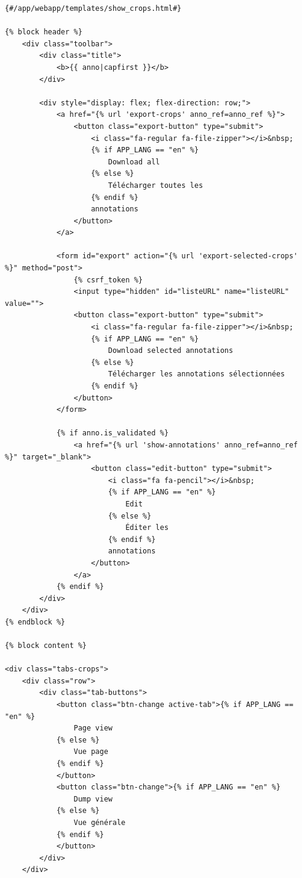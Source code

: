 \begin{lstlisting}[language=HTML5, frame=single, breaklines=true, caption={Template \html pour l'affichage des crops de diagrammes.}]
{#/app/webapp/templates/show_crops.html#}

{% block header %}
    <div class="toolbar">
        <div class="title">
            <b>{{ anno|capfirst }}</b>
        </div>

        <div style="display: flex; flex-direction: row;">
            <a href="{% url 'export-crops' anno_ref=anno_ref %}">
                <button class="export-button" type="submit">
                    <i class="fa-regular fa-file-zipper"></i>&nbsp;
                    {% if APP_LANG == "en" %}
                        Download all
                    {% else %}
                        Télécharger toutes les
                    {% endif %}
                    annotations
                </button>
            </a>

            <form id="export" action="{% url 'export-selected-crops' %}" method="post">
                {% csrf_token %}
                <input type="hidden" id="listeURL" name="listeURL" value="">
                <button class="export-button" type="submit">
                    <i class="fa-regular fa-file-zipper"></i>&nbsp;
                    {% if APP_LANG == "en" %}
                        Download selected annotations
                    {% else %}
                        Télécharger les annotations sélectionnées
                    {% endif %}
                </button>
            </form>

            {% if anno.is_validated %}
                <a href="{% url 'show-annotations' anno_ref=anno_ref %}" target="_blank">
                    <button class="edit-button" type="submit">
                        <i class="fa fa-pencil"></i>&nbsp;
                        {% if APP_LANG == "en" %}
                            Edit
                        {% else %}
                            Éditer les
                        {% endif %}
                        annotations
                    </button>
                </a>
            {% endif %}
        </div>
    </div>
{% endblock %}

{% block content %}

<div class="tabs-crops">
    <div class="row">
        <div class="tab-buttons">
            <button class="btn-change active-tab">{% if APP_LANG == "en" %}
                Page view
            {% else %}
                Vue page
            {% endif %}
            </button>
            <button class="btn-change">{% if APP_LANG == "en" %}
                Dump view
            {% else %}
                Vue générale
            {% endif %}
            </button>
        </div>
    </div>


\end{lstlisting}
